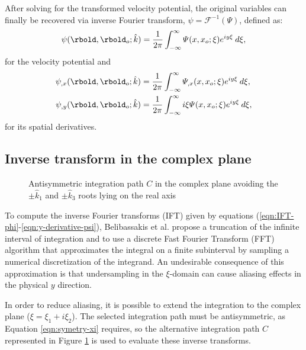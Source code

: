 After solving for the transformed velocity potential, the original variables can finally be recovered via inverse Fourier transform, $\psi=\mathcal{F}^{-1}(\varPsi)$, defined as:
\begin{equation}
\label{eqn:IFT-phi}
\psi(\rbold,\rbold_o; \hat{k}) = \dfrac{1}{2\pi} \int_{-\infty}^{\infty} \varPsi (x,x_o;\xi) e^{ i y \xi} \: d\xi,
\end{equation}
%
for the velocity potential and
%
\begin{align}
\label{eqn:x-derivative-psi}
\psi_{,x}(\rbold,\rbold_o; \hat{k}) &=
\dfrac{1}{2\pi} \int_{-\infty}^{\infty} \varPsi_{,x} (x,x_o;\xi) e^{ i y \xi} \: d\xi, 
\\
\label{eqn:y-derivative-psi}
\psi_{,y}(\rbold,\rbold_o; \hat{k}) &=
\dfrac{1}{2\pi} \int_{-\infty}^{\infty} i\xi  \varPsi (x,x_o;\xi) e^{ i y \xi} \: d\xi,
\end{align}
for its spatial derivatives.

\subsection{Inverse transform in the complex plane}
\label{subsec:complex xi}
%
\begin{figure}
\centering
\def\svgwidth{0.9\columnwidth}

\caption{Antisymmetric integration path $C$ in the complex plane avoiding the $\pm\hat{k}_1$ and $\pm\hat{k}_3$ roots lying on the real axis}
\label{fig:IntegrationPath1}
\end{figure}
%

To compute the inverse Fourier transforms (IFT) given by equations (\ref{eqn:IFT-phi}-\ref{eqn:y-derivative-psi}), Belibassakis et al. \cite{Belibassakis2000,Belibassakis2004} propose a truncation of the infinite interval of integration and to use a discrete Fast Fourier Transform (FFT) algorithm that approximates the integral on a finite subinterval by sampling a numerical discretization of the integrand. An undesirable consequence of this approximation is that undersampling in the $\xi$-domain can cause aliasing effects in the physical $y$ direction.

In order to reduce aliasing, it is possible to extend the integration to the complex plane ($\xi=\xi_{1}+i\xi_{2}$). The selected integration path must be antisymmetric, as Equation \eqref{eqn:symetry-xi} requires, so the alternative integration path $C$ represented in Figure \ref{fig:IntegrationPath1} is used to evaluate these inverse transforms. 

